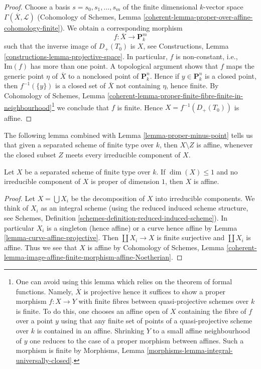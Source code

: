 \begin{proof}
\medskip\noindent
Choose a basis $s = s_0, s_1, \ldots, s_m$ of the finite dimensional
$k$-vector space $\Gamma(\overline{X}, \mathcal{L})$
(Cohomology of Schemes, Lemma
\ref{coherent-lemma-proper-over-affine-cohomology-finite}).
We obtain a corresponding morphism
$$
f : \overline{X} \longrightarrow \mathbf{P}^m_k
$$
such that the inverse image of $D_{+}(T_0)$ is $X$, see
Constructions, Lemma \ref{constructions-lemma-projective-space}.
In particular, $f$ is non-constant, i.e., $\text{Im}(f)$ has more
than one point. A topological argument shows that $f$ maps the generic
point $\eta$ of $\overline{X}$ to a nonclosed point of $\mathbf{P}^n_k$.
Hence if $y \in \mathbf{P}^n_k$ is a closed point, then $f^{-1}(\{y\})$
is a closed set of $\overline{X}$ not containing $\eta$, hence finite.
By Cohomology of Schemes, Lemma
\ref{coherent-lemma-proper-finite-fibre-finite-in-neighbourhood}\footnote{One
can avoid using this lemma which relies on the theorem of formal
functions. Namely, $\overline{X}$ is projective hence it suffices to show
a proper morphism $f : X \to Y$ with finite fibres between quasi-projective
schemes over $k$ is finite. To do this, one chooses an affine open of $X$
containing the fibre of $f$ over a point $y$ using that any finite set of
points of a quasi-projective scheme over $k$ is contained in an affine.
Shrinking $Y$ to a small affine neighbourhood of $y$ one reduces to the
case of a proper morphism between affines. Such a morphism is finite by
Morphisms, Lemma \ref{morphisms-lemma-integral-universally-closed}.}
we conclude that $f$ is finite. Hence $X = f^{-1}(D_{+}(T_0))$
is affine.
\end{proof}

\noindent
The following lemma combined with Lemma \ref{lemma-proper-minus-point}
tells us that given a separated scheme of finite type over $k$, then
$X \setminus Z$ is affine, whenever the closed subset $Z$ meets every
irreducible component of $X$.

\begin{lemma}
\label{lemma-dim-1-nonproper-affine}
Let $X$ be a separated scheme of finite type over $k$.
If $\dim(X) \leq 1$ and no irreducible component of $X$
is proper of dimension $1$, then $X$ is affine.
\end{lemma}

\begin{proof}
Let $X = \bigcup X_i$ be the decomposition of $X$ into irreducible components.
We think of $X_i$ as an integral scheme (using the reduced induced scheme
structure, see Schemes, Definition
\ref{schemes-definition-reduced-induced-scheme}).
In particular $X_i$ is a singleton (hence affine) or a curve
hence affine by Lemma \ref{lemma-curve-affine-projective}.
Then $\coprod X_i \to X$ is finite surjective and $\coprod X_i$ is affine.
Thus we see that $X$ is affine by
Cohomology of Schemes, Lemma
\ref{coherent-lemma-image-affine-finite-morphism-affine-Noetherian}.
\end{proof}






